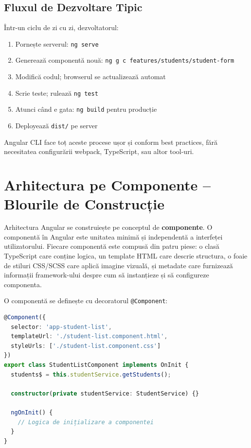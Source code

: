 \subsection{Fluxul de Dezvoltare Tipic}

Într-un ciclu de zi cu zi, dezvoltatorul:

\begin{enumerate}
  \item Pornește serverul: \texttt{ng serve}
  \item Generează componentă nouă: \texttt{ng g c features/students/student-form}
  \item Modifică codul; browserul se actualizează automat
  \item Scrie teste; rulează \texttt{ng test}
  \item Atunci când e gata: \texttt{ng build} pentru producție
  \item Deployează \texttt{dist/} pe server
\end{enumerate}

Angular CLI face toț aceste procese ușor și conform best practices, fără necesitatea configurării webpack, TypeScript, sau altor tool-uri.

\section{Arhitectura pe Componente – Blourile de Construcție}

Arhitectura Angular se construiește pe conceptul de \textbf{componente}. O componentă în Angular este unitatea minimă și independentă a interfeței utilizatorului. Fiecare componentă este compusă din patru piese: o clasă TypeScript care conține logica, un template HTML care descrie structura, o foaie de stiluri CSS/SCSS care aplică imagine vizuală, și metadate care furnizează informații framework-ului despre cum să instanțieze și să configureze componenta.

O componentă se definește cu decoratorul \texttt{@Component}:

\begin{lstlisting}[language=TypeScript]
@Component({
  selector: 'app-student-list',
  templateUrl: './student-list.component.html',
  styleUrls: ['./student-list.component.css']
})
export class StudentListComponent implements OnInit {
  students$ = this.studentService.getStudents();

  constructor(private studentService: StudentService) {}

  ngOnInit() {
    // Logica de inițializare a componentei
  }
}
\end{lstlisting}

